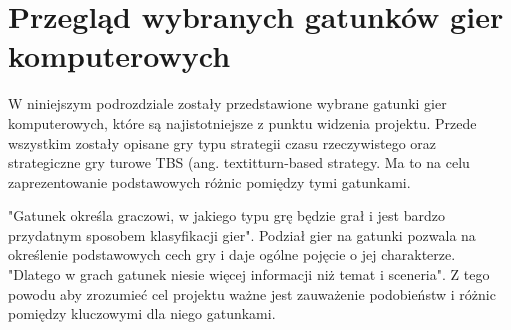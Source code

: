 \section{Przegląd wybranych gatunków gier komputerowych}
W niniejszym podrozdziale zostały przedstawione wybrane gatunki gier komputerowych, które są najistotniejsze z punktu widzenia
projektu. Przede wszystkim zostały opisane gry typu strategii czasu rzeczywistego oraz strategiczne gry turowe TBS (ang.
textit{turn-based strategy}. Ma to na celu zaprezentowanie podstawowych różnic pomiędzy tymi gatunkami.

"Gatunek określa graczowi, w jakiego typu grę będzie grał i jest bardzo przydatnym sposobem klasyfikacji gier"\cite{practical_game_design}.
Podział gier na gatunki pozwala na określenie podstawowych cech gry i daje ogólne pojęcie o jej charakterze. "Dlatego w
grach gatunek niesie więcej informacji niż temat i sceneria"\cite{practical_game_design}. Z tego powodu aby zrozumieć cel projektu ważne jest zauważenie podobieństw i różnic pomiędzy kluczowymi dla niego gatunkami.





